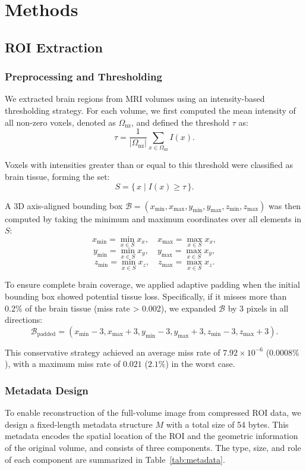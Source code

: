 \documentclass[runningheads]{llncs}
\begin{document}
\section{Methods}

\subsection{ROI Extraction} 
\subsubsection{Preprocessing and Thresholding} We extracted brain regions from MRI volumes using an intensity-based thresholding strategy. For each volume, we first computed the mean intensity of all non-zero voxels, denoted as $\Omega_{\mathrm{nz}}$, and defined the threshold $\tau$ as:
$$\tau = \frac{1}{|\Omega_{\mathrm{nz}}|} \sum_{x \in \Omega_{\mathrm{nz}}} I(x).$$

Voxels with intensities greater than or equal to this threshold were classified as brain tissue, forming the set:
$$S = \{\, x \mid I(x) \ge \tau \,\}.$$

A 3D axis-aligned bounding box $\mathcal{B} = (x_{\min}, x_{\max}, y_{\min}, y_{\max}, z_{\min}, z_{\max})$ was then computed by taking the minimum and maximum coordinates over all elements in $S$:
$$x_{\min} = \min_{x \in S} x_x,\quad x_{\max} = \max_{x \in S} x_x,$$
$$y_{\min} = \min_{x \in S} x_y,\quad y_{\max} = \max_{x \in S} x_y,$$
$$z_{\min} = \min_{x \in S} x_z,\quad z_{\max} = \max_{x \in S} x_z.$$

To ensure complete brain coverage, we applied adaptive padding when the initial bounding box showed potential tissue loss. Specifically, if it misses more than 0.2\% of the brain tissue (miss rate > 0.002), we expanded $\mathcal{B}$ by 3 pixels in all directions:
$$\mathcal{B}_{\text{padded}} = (x_{\min}-3, x_{\max}+3, y_{\min}-3, y_{\max}+3, z_{\min}-3, z_{\max}+3).$$

This conservative strategy achieved an average miss rate of $7.92 \times 10^{-6}$
($0.0008\%$), with a maximum miss rate of $0.021$ ($2.1\%$) in the
worst case.


\subsubsection{Metadata Design} 
\label{sec:roi_metadata}
To enable reconstruction of the full-volume image from compressed ROI data, 
we design a fixed-length metadata structure $M$ with a total size of 54 bytes. 
This metadata encodes the spatial location of the ROI and the geometric 
information of the original volume, and consists of three components. 
The type, size, and role of each component are summarized in 
Table~\ref{tab:metadata}.
\end{document}

